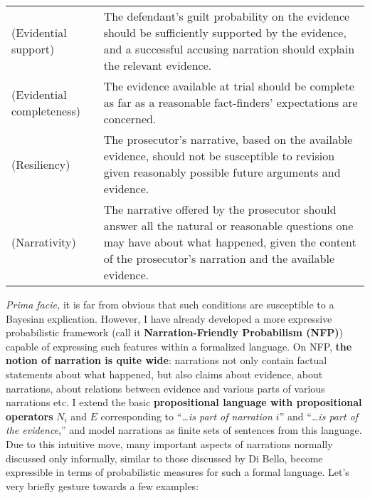 \documentclass[11pt, a4paper]{article}
\begin{document}
\begin{center}
\begin{tabular}{@{}lp{11.5cm}@{}}
\toprule
 (Evidential support) &The defendant's guilt probability on the evidence should be sufficiently supported by the evidence, and a successful accusing narration should explain the relevant evidence. \\
(Evidential completeness) &  The evidence available at trial should be complete as far as a reasonable fact-finders' expectations are concerned. \\
(Resiliency)&  The prosecutor's narrative, based on the available evidence, should not be susceptible to revision given reasonably possible future arguments and evidence. \\
(Narrativity) & The narrative offered by the prosecutor should answer all 
the natural or reasonable questions one may have about what happened, given the content of the prosecutor's narration and the available evidence. \\
\bottomrule
\end{tabular}
\end{center}

\vspace{-2mm}


 \emph{Prima facie,} it is far from obvious that such conditions are susceptible  to a Bayesian explication. However, I have already developed  a more expressive probabilistic framework (call it \textbf{Narration-Friendly Probabilism (NFP)}) capable of expressing such features within a formalized language. On NFP, \textbf{the notion of narration is quite wide}: narrations not only contain factual statements about what happened, but also claims about evidence, about narrations,  about relations between evidence and various parts of various narrations etc. I extend the basic \textbf{propositional language  with propositional operators} $N_i$ and $E$ corresponding to ``\emph{\dots is part of narration $i$}'' and ``\emph{\dots is part of the evidence},'' and  model  narrations as finite sets of sentences from this language. Due to this intuitive move, many important aspects of narrations normally discussed only informally, similar to those discussed by Di Bello, become expressible in terms of probabilistic measures for such a formal language.  Let's very briefly gesture towards a few examples:
 
\vspace{-4mm}
\end{document}
